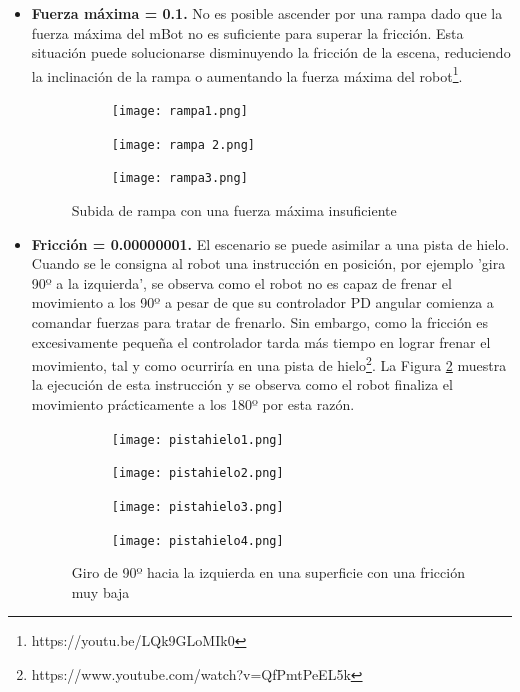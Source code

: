 \begin{itemize}

  \item \textbf{Fuerza máxima = 0.1.} No es posible ascender por una rampa dado que la fuerza máxima del mBot no es suficiente para superar la fricción. Esta situación puede solucionarse disminuyendo la fricción de la escena, reduciendo la inclinación de la rampa o aumentando la fuerza máxima del robot\footnote{https://youtu.be/LQk9GLoMIk0}.
    
    \begin{figure}[h!]
  \begin{subfigure}[b]{0.3\textwidth}
    \texttt{[image: rampa1.png]}
  \end{subfigure}
  \hfill
  \begin{subfigure}[b]{0.3\textwidth}
    \texttt{[image: rampa 2.png]}
  \end{subfigure}
    \hfill
  \begin{subfigure}[b]{0.3\textwidth}
    \texttt{[image: rampa3.png]}
  \end{subfigure}
\caption{Subida de rampa con una fuerza máxima insuficiente}
\label{fig:rampa}
\end{figure}
    \item \textbf{Fricción = 0.00000001.} El escenario se puede asimilar a una pista de hielo. Cuando se le consigna al robot una instrucción en posición, por ejemplo 'gira 90º a la izquierda', se observa como el robot no es capaz de frenar el movimiento a los 90º a pesar de que su controlador PD angular comienza a comandar fuerzas para tratar de frenarlo. Sin embargo, como la fricción es excesivamente pequeña el controlador tarda más tiempo en lograr frenar el movimiento, tal y como ocurriría en una pista de hielo\footnote{https://www.youtube.com/watch?v=QfPmtPeEL5k}. La Figura \ref{fig:pistahielo} muestra la ejecución de esta instrucción y se observa como el robot finaliza el movimiento prácticamente a los 180º por esta razón.

\begin{figure}[h!]
  \begin{subfigure}[b]{0.5\textwidth}
    \texttt{[image: pistahielo1.png]}
  \end{subfigure}
  \hfill
  \hfill
  \begin{subfigure}[b]{0.5\textwidth}
    \texttt{[image: pistahielo2.png]}
  \end{subfigure}
    \hfill
    \hfill
  \begin{subfigure}[b]{0.5\textwidth}
    \texttt{[image: pistahielo3.png]}
  \end{subfigure}
    \hfill
  \begin{subfigure}[b]{0.5\textwidth}
    \texttt{[image: pistahielo4.png]}
  \end{subfigure}
\caption{Giro de 90º hacia la izquierda en una superficie con una fricción muy baja}
\label{fig:pistahielo}
\end{figure}
\end{itemize}

